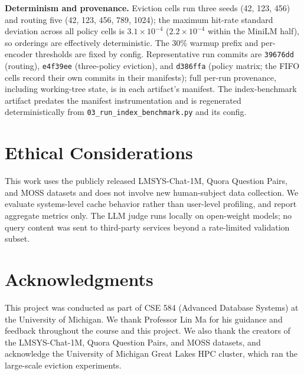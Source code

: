 \documentclass[sigconf,nonacm]{acmart}
\begin{document}
\textbf{Determinism and provenance.} Eviction cells run three seeds (42, 123, 456) and routing five (42, 123, 456, 789, 1024); the maximum hit-rate standard deviation across all policy cells is $3.1\times10^{-4}$ ($2.2\times10^{-4}$ within the MiniLM half), so orderings are effectively deterministic. The 30\% warmup prefix and per-encoder thresholds are fixed by config. Representative run commits are \texttt{39676dd} (routing), \texttt{e4f39ee} (three-policy eviction), and \texttt{d386ffa} (policy matrix; the FIFO cells record their own commits in their manifests); full per-run provenance, including working-tree state, is in each artifact's manifest. The index-benchmark artifact predates the manifest instrumentation and is regenerated deterministically from \texttt{03\_run\_index\_benchmark.py} and its config.

\section{Ethical Considerations}
This work uses the publicly released LMSYS-Chat-1M, Quora Question Pairs, and MOSS datasets and does not involve new human-subject data collection. We evaluate systems-level cache behavior rather than user-level profiling, and report aggregate metrics only. The LLM judge runs locally on open-weight models; no query content was sent to third-party services beyond a rate-limited validation subset.

\section*{Acknowledgments}
This project was conducted as part of CSE 584 (Advanced Database Systems) at the University of Michigan. We thank Professor Lin Ma for his guidance and feedback throughout the course and this project. We also thank the creators of the LMSYS-Chat-1M, Quora Question Pairs, and MOSS datasets, and acknowledge the University of Michigan Great Lakes HPC cluster, which ran the large-scale eviction experiments.
\vspace{-0.3cm}
\balance


\end{document}
